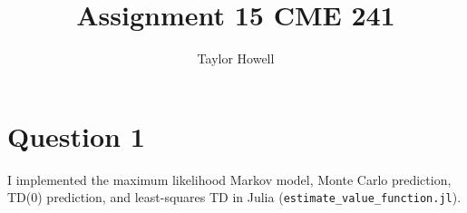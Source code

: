 \documentclass[12pt]{article}
\title{\textbf{Assignment 15 CME 241}}
\author{Taylor Howell}
\begin{document}
\maketitle

\newpage

\section{Question 1}
I implemented the maximum likelihood Markov model, Monte Carlo prediction, TD(0) prediction, and least-squares TD in Julia (\texttt{estimate_value_function.jl}). 
\end{document}
